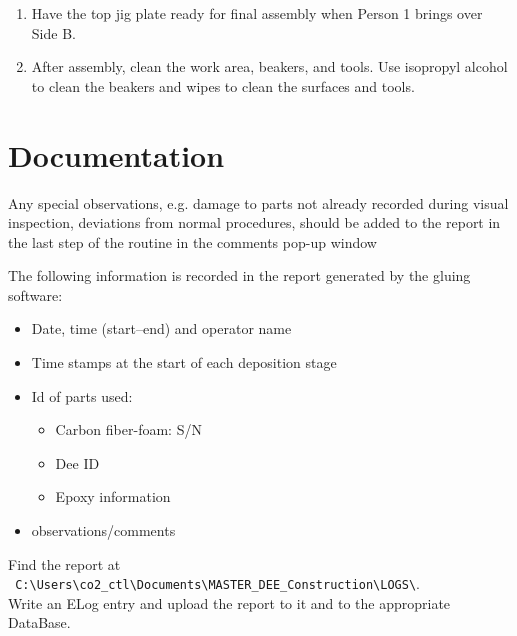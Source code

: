 \documentclass[12pt]{cornelltfpxsop}
\begin{document}
\begin{enumerate}
    \item Have the top jig plate ready for final assembly when Person 1 brings over Side B.

    \item After assembly, clean the work area, beakers, and tools. Use isopropyl alcohol to clean the beakers and wipes to clean the surfaces and tools.
\end{enumerate}
\section{Documentation}

Any special observations, e.g. damage to parts not already recorded during visual inspection, deviations from normal procedures, should be added to the report in the last step of the routine in the comments pop-up window 

The following information is recorded in the report generated by the gluing software:
\begin{itemize}
    \item Date, time (start--end) and operator name
    \item Time stamps at the start of each deposition stage
    \item Id of parts used:
	\begin{itemize}
	    \item Carbon fiber-foam: S/N
	    \item Dee ID
	    \item Epoxy information
	\end{itemize}
    \item observations/comments
\end{itemize}

Find the report at \\ \verb| C:\Users\co2_ctl\Documents\MASTER_DEE_Construction\LOGS\|.\\ Write an ELog entry and upload the report to it and to the appropriate DataBase.  
\end{document}
